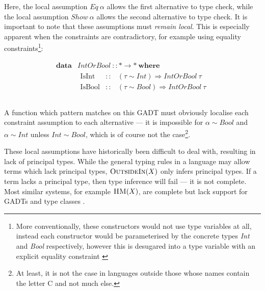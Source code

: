 \documentclass[a4paper]{jfp}
\newcommand{\outsidein}{\textsc{OutsideIn}(X)}
\begin{document}
\medskip

Here, the local assumption $\mathit{Eq}\ \alpha$ allows the first alternative to type check, while the local assumption $\mathit{Show}\
\alpha$ allows the second alternative to type check. It is important to note that these assumptions must \emph{remain local}. This is especially
apparent when the constraints are contradictory, for example using equality constraints\footnote{More conventionally, these constructors would not use
   type variables at all, instead each constructor would be parameterised by the concrete types \emph{Int} and \emph{Bool} respectively, however this
   is desugared into a type variable with an explicit equality constraint \cite{Schrijvers:2009jg}}:

\begin{displaymath}
	\begin{array}{ll}		
		\textbf{data} & \mathit{IntOrBool}\ :: \mathtt{*} \rightarrow \mathtt{*}\ \textbf{where} \\
		              & \begin{array}{lcl}
                         \text{IsInt} & :: & (\tau \sim \mathit{Int}) \Rightarrow \mathit{IntOrBool}\ \tau \\
                         \text{IsBool} & :: & (\tau \sim \mathit{Bool}) \Rightarrow \mathit{IntOrBool}\ \tau \\
					    \end{array} \\						
     \end{array}
\end{displaymath}


\medskip

A function which pattern matches on this GADT must obviously localise each constraint assumption to each alternative --- it is impossible for $\alpha
\sim \mathit{Bool}$ and $\alpha \sim \mathit{Int}$ unless $\mathit{Int} \sim \mathit{Bool}$, which is of course not the case\footnote{At least, it is
   not the case in languages outside those whose names contain the letter C and not much else.}. 


\medskip

These local assumptions have historically been difficult to deal with, resulting in lack of principal types. While the general typing rules in a
language may allow terms which lack principal types, $\outsidein$ only infers principal types. If a term lacks a principal type, then type inference
will fail --- it is not complete. Most similar systems, for example $\textsc{HM}(X)$, are complete but lack support for GADTs and type classes
\cite{Pottier:2005ue}.
\end{document}
